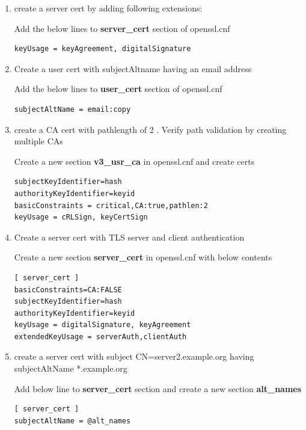 \documentclass[a4paper]{article}
\begin{document}
\begin{enumerate}[label*=\arabic*.]
        Add the below lines to \textbf{user\_cert} section of openssl.cnf
        \begin{lstlisting}
keyUsage = nonRepudiation, digitalSignature
        \end{lstlisting}

    \item create a server cert by adding following extensions:

        Add the below  lines to \textbf{server\_cert} section of openssl.cnf
        \begin{lstlisting}
keyUsage = keyAgreement, digitalSignature
        \end{lstlisting}
    
    \item Create a user cert with subjectAltname having an email address

        Add the below lines to \textbf{user\_cert} section of openssl.cnf
        \begin{lstlisting}
subjectAltName = email:copy
        \end{lstlisting}

    \item create a CA cert with pathlength of 2 . Verify path validation by creating multiple CAs

        Create a new section \textbf{v3\_usr\_ca} in openssl.cnf and create certs
        \begin{lstlisting}
subjectKeyIdentifier=hash
authorityKeyIdentifier=keyid
basicConstraints = critical,CA:true,pathlen:2
keyUsage = cRLSign, keyCertSign
        \end{lstlisting}
    
    \item Create a server cert with TLS server and client authentication

        Create a new section \textbf{server\_cert} in openssl.cnf with below contents
        \begin{lstlisting}
[ server_cert ]
basicConstraints=CA:FALSE
subjectKeyIdentifier=hash
authorityKeyIdentifier=keyid
keyUsage = digitalSignature, keyAgreement
extendedKeyUsage = serverAuth,clientAuth
        \end{lstlisting}

    \item create a server cert with subject CN=server2.example.org having subjectAltName *.example.org
        
        Add below line to \textbf{server\_cert} section and create a new section \textbf{alt\_names}
        \begin{lstlisting}
[ server_cert ]
subjectAltName = @alt_names


\end{lstlisting}
\end{enumerate}
\end{document}
